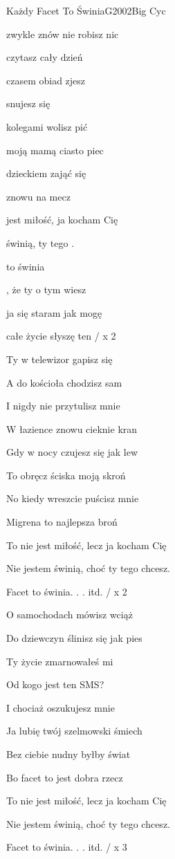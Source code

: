 \begin{song}{Każdy Facet To Świnia}{G}{2002}{Big Cyc}{}{}
	\begin{SBVerse}
	 zwykle znów nie robisz nic

	 czytasz cały dzień

	 czasem obiad zjesz

	 snujesz się 

	 kolegami wolisz pić

	 moją mamą ciasto piec

	 dzieckiem zająć się

	 znowu  na mecz

	 jest miłość,  ja kocham Cię

	 świnią,  ty tego .
	\end{SBVerse}
	\begin{SBChorus}
	 to świnia

	, że ty o tym wiesz

	 ja się staram jak mogę

	 całe życie słyszę ten  / x 2
	\end{SBChorus}
	\begin{SBVerse}
	Ty w telewizor gapisz się

	A do kościoła chodzisz sam

	I nigdy nie przytulisz mnie

	W łazience znowu cieknie kran

	Gdy w nocy czujesz się jak lew

	To obręcz ściska moją skroń

	No kiedy wreszcie puścisz mnie

	Migrena to najlepsza broń

	To nie jest miłość, lecz ja kocham Cię

	Nie jestem świnią, choć ty tego chcesz.
	\end{SBVerse}
	\begin{SBChorus}
	Facet to świnia. . . itd. / x 2
	\end{SBChorus}
	\begin{SBVerse}
	O samochodach mówisz wciąż

	Do dziewczyn ślinisz się jak pies

	Ty życie zmarnowałeś mi

	Od kogo jest ten SMS?

	I chociaż oszukujesz mnie

	Ja lubię twój szelmowski śmiech

	Bez ciebie nudny byłby świat

	Bo facet to jest dobra rzecz

	To nie jest miłość, lecz ja kocham Cię

	Nie jestem świnią, choć ty tego chcesz.
	\end{SBVerse}
	\begin{SBChorus}
	Facet to świnia. . . itd. / x 3
	\end{SBChorus}
\end{song}
